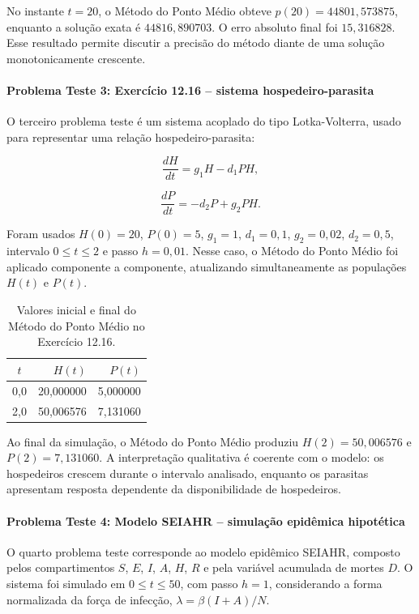 No instante \(t=20\), o Método do Ponto Médio obteve \(p(20)=44801{,}573875\), enquanto a solução exata é \(44816{,}890703\). O erro absoluto final foi \(15{,}316828\). Esse resultado permite discutir a precisão do método diante de uma solução monotonicamente crescente.

\paragraph{Problema Teste 3: Exercício 12.16 -- sistema hospedeiro-parasita}

O terceiro problema teste é um sistema acoplado do tipo Lotka-Volterra, usado para representar uma relação hospedeiro-parasita:

\[
    \frac{dH}{dt}=g_1H-d_1PH,
\]

\[
    \frac{dP}{dt}=-d_2P+g_2PH.
\]

Foram usados \(H(0)=20\), \(P(0)=5\), \(g_1=1\), \(d_1=0{,}1\), \(g_2=0{,}02\), \(d_2=0{,}5\), intervalo \(0\leq t\leq 2\) e passo \(h=0{,}01\). Nesse caso, o Método do Ponto Médio foi aplicado componente a componente, atualizando simultaneamente as populações \(H(t)\) e \(P(t)\).

\begin{table}[H]
    \centering
    \caption{Valores inicial e final do Método do Ponto Médio no Exercício 12.16.}
    \begin{tabular}{c|r|r}
        \textbf{\(t\)} & \textbf{\(H(t)\)} & \textbf{\(P(t)\)} \\
        \hline
        0{,}0 & 20{,}000000 & 5{,}000000 \\
        2{,}0 & 50{,}006576 & 7{,}131060 \\
    \end{tabular}
\end{table}

Ao final da simulação, o Método do Ponto Médio produziu \(H(2)=50{,}006576\) e \(P(2)=7{,}131060\). A interpretação qualitativa é coerente com o modelo: os hospedeiros crescem durante o intervalo analisado, enquanto os parasitas apresentam resposta dependente da disponibilidade de hospedeiros.

\paragraph{Problema Teste 4: Modelo SEIAHR -- simulação epidêmica hipotética}

O quarto problema teste corresponde ao modelo epidêmico SEIAHR, composto pelos compartimentos \(S\), \(E\), \(I\), \(A\), \(H\), \(R\) e pela variável acumulada de mortes \(D\). O sistema foi simulado em \(0\leq t\leq 50\), com passo \(h=1\), considerando a forma normalizada da força de infecção, \(\lambda=\beta(I+A)/N\).

